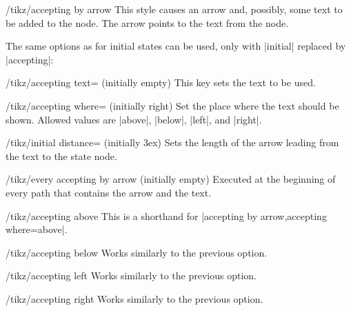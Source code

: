\begin{stylekey}{/tikz/accepting by arrow}
  This style causes an arrow and, possibly, some text to be added to
  the node. The arrow points to the text from the node.

  The same options as for initial states can be used, only with
  |initial| replaced by |accepting|:
  \begin{key}{/tikz/accepting text= (initially \normalfont empty)}
    This key sets the text to be used.
  \end{key}
  \begin{key}{/tikz/accepting where= (initially right)}
    Set the place where the text should be shown. Allowed values are
    |above|, |below|, |left|, and |right|.
  \end{key}
  \begin{key}{/tikz/initial distance= (initially 3ex)}
    Sets the length of the arrow leading from the text to the state
    node.
  \end{key}
  \begin{stylekey}{/tikz/every accepting by arrow (initially \normalfont empty)}
    Executed at the beginning of every path that contains
    the arrow and the text.
  \end{stylekey}
\begin{codeexample}[]
\end{codeexample}
\end{stylekey}

\begin{stylekey}{/tikz/accepting above}
  This is a shorthand for |accepting by arrow,accepting where=above|.
\end{stylekey}
\begin{stylekey}{/tikz/accepting below}
  Works similarly to the previous option.
\end{stylekey}
\begin{stylekey}{/tikz/accepting left}
  Works similarly to the previous option.
\end{stylekey}
\begin{stylekey}{/tikz/accepting right}
  Works similarly to the previous option.
\end{stylekey}



